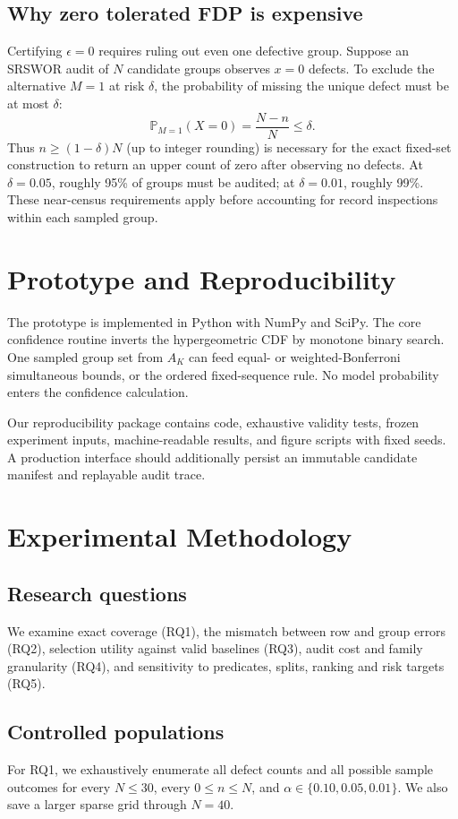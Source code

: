 \documentclass[runningheads]{llncs}
\newcommand{\Prb}{\mathbb{P}}
\begin{document}
\subsection{Why zero tolerated FDP is expensive}
Certifying $\epsilon=0$ requires ruling out even one defective group. Suppose an SRSWOR audit of $N$ candidate groups observes $x=0$ defects. To exclude the alternative $M=1$ at risk $\delta$, the probability of missing the unique defect must be at most $\delta$:
\begin{equation}
\Prb_{M=1}(X=0)=\frac{N-n}{N}\le\delta.
\end{equation}
Thus $n\ge (1-\delta)N$ (up to integer rounding) is necessary for the exact fixed-set construction to return an upper count of zero after observing no defects. At $\delta=0.05$, roughly 95\% of groups must be audited; at $\delta=0.01$, roughly 99\%. These near-census requirements apply before accounting for record inspections within each sampled group.

\section{Prototype and Reproducibility}
The prototype is implemented in Python with NumPy and SciPy. The core confidence routine inverts the hypergeometric CDF by monotone binary search. One sampled group set from $A_K$ can feed equal- or weighted-Bonferroni simultaneous bounds, or the ordered fixed-sequence rule. No model probability enters the confidence calculation.

Our reproducibility package contains code, exhaustive validity tests, frozen experiment inputs, machine-readable results, and figure scripts with fixed seeds. A production interface should additionally persist an immutable candidate manifest and replayable audit trace.

\section{Experimental Methodology}
\subsection{Research questions}
We examine exact coverage (RQ1), the mismatch between row and group errors (RQ2), selection utility against valid baselines (RQ3), audit cost and family granularity (RQ4), and sensitivity to predicates, splits, ranking and risk targets (RQ5).


\subsection{Controlled populations}
For RQ1, we exhaustively enumerate all defect counts and all possible sample outcomes for every $N\le30$, every $0\le n\le N$, and $\alpha\in\{0.10,0.05,0.01\}$. We also save a larger sparse grid through $N=40$.
\end{document}
